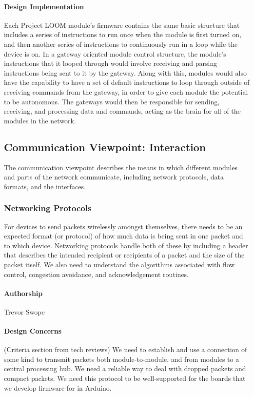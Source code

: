 \documentclass[onecolumn, draftclsnofoot,10pt, compsoc]{IEEEtran}
\begin{document}
\paragraph{Design Implementation}
    Each Project LOOM module's firmware contains the same basic structure that includes a series of instructions to run once when the module is first turned on, and then another series of instructions to continuously run in a loop while the device is on. In a gateway oriented module control structure, the module's instructions that it looped through would involve receiving and parsing instructions being sent to it by the gateway. Along with this, modules would also have the capability to have a set of default instructions to loop through outside of receiving commands from the gateway, in order to give each module the potential to be autonomous. The gateways would then be responsible for sending, receiving, and processing data and commands, acting as the brain for all of the modules in the network. 






\subsection{Communication Viewpoint: Interaction}
    The communication viewpoint describes the means in which different modules and parts of the network communicate, including network protocols, data formats, and the interfaces.

\subsubsection{Networking Protocols}
    For devices to send packets wirelessly amongst themselves, there needs to be an expected format (or protocol) of how much data is being sent in one packet and to which device. Networking protocols handle both of these by including a header that describes the intended recipient or recipients of a packet and the size of the packet itself. We also need to understand the algorithms associated with flow control, congestion avoidance, and acknowledgement routines.

\paragraph{Authorship}
    Trevor Swope

\paragraph{Design Concerns} (Criteria section from tech reviews)
    We need to establish and use a connection of some kind to transmit packets both module-to-module, and from modules to a central processing hub. We need a reliable way to deal with dropped packets and compact packets. We need this protocol to be well-supported for the boards that we develop firmware for in Arduino.
\end{document}
